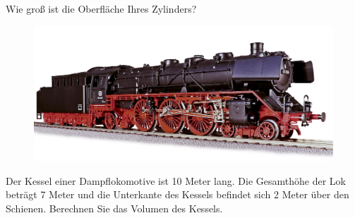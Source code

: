 \documentclass[11pt, a4paper, oneside]{article}
\begin{document}
	Wie groß ist die Oberfläche Ihres Zylinders?
	
	\checkered[18cm]
	
	
	\begin{figure}[h!]
		\centering
		\includegraphics[width=.5\textwidth]{steam-locomotive.png}
	\end{figure}

	Der Kessel einer Dampflokomotive ist 10 Meter lang.
	Die Gesamthöhe der Lok beträgt 7 Meter und die Unterkante des Kessels befindet sich 2 Meter über den Schienen.
	Berechnen Sie das Volumen des Kessels.
	
	
	\checkered[12.5cm]	
\end{document}
